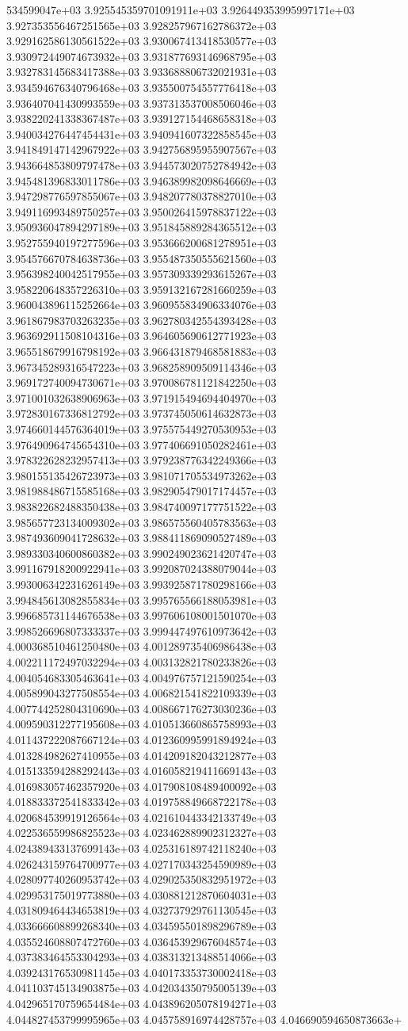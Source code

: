 534599047e+03	3.925545359701091911e+03	3.926449353995997171e+03	3.927353556467251565e+03	3.928257967162786372e+03	3.929162586130561522e+03	3.930067413418530577e+03	3.930972449074673932e+03	3.931877693146968795e+03	3.932783145683417388e+03	3.933688806732021931e+03	3.934594676340796468e+03	3.935500754557776418e+03	3.936407041430993559e+03	3.937313537008506046e+03	3.938220241338367487e+03	3.939127154468658318e+03	3.940034276447454431e+03	3.940941607322858545e+03	3.941849147142967922e+03	3.942756895955907567e+03	3.943664853809797478e+03	3.944573020752784942e+03	3.945481396833011786e+03	3.946389982098646669e+03	3.947298776597855067e+03	3.948207780378827010e+03	3.949116993489750257e+03	3.950026415978837122e+03	3.950936047894297189e+03	3.951845889284365512e+03	3.952755940197277596e+03	3.953666200681278951e+03	3.954576670784638736e+03	3.955487350555621560e+03	3.956398240042517955e+03	3.957309339293615267e+03	3.958220648357226310e+03	3.959132167281660259e+03	3.960043896115252664e+03	3.960955834906334076e+03	3.961867983703263235e+03	3.962780342554393428e+03	3.963692911508104316e+03	3.964605690612771923e+03	3.965518679916798192e+03	3.966431879468581883e+03	3.967345289316547223e+03	3.968258909509114346e+03	3.969172740094730671e+03	3.970086781121842250e+03	3.971001032638906963e+03	3.971915494694404970e+03	3.972830167336812792e+03	3.973745050614632873e+03	3.974660144576364019e+03	3.975575449270530953e+03	3.976490964745654310e+03	3.977406691050282461e+03	3.978322628232957413e+03	3.979238776342249366e+03	3.980155135426723973e+03	3.981071705534973262e+03	3.981988486715585168e+03	3.982905479017174457e+03	3.983822682488350438e+03	3.984740097177751522e+03	3.985657723134009302e+03	3.986575560405783563e+03	3.987493609041728632e+03	3.988411869090527489e+03	3.989330340600860382e+03	3.990249023621420747e+03	3.991167918200922941e+03	3.992087024388079044e+03	3.993006342231626149e+03	3.993925871780298166e+03	3.994845613082855834e+03	3.995765566188053981e+03	3.996685731144676538e+03	3.997606108001501070e+03	3.998526696807333337e+03	3.999447497610973642e+03	4.000368510461250480e+03	4.001289735406986438e+03	4.002211172497032294e+03	4.003132821780233826e+03	4.004054683305463641e+03	4.004976757121590254e+03	4.005899043277508554e+03	4.006821541822109339e+03	4.007744252804310690e+03	4.008667176273030236e+03	4.009590312277195608e+03	4.010513660865758993e+03	4.011437222087667124e+03	4.012360995991894924e+03	4.013284982627410955e+03	4.014209182043212877e+03	4.015133594288292443e+03	4.016058219411669143e+03	4.016983057462357920e+03	4.017908108489400092e+03	4.018833372541833342e+03	4.019758849668722178e+03	4.020684539919126564e+03	4.021610443342133749e+03	4.022536559986825523e+03	4.023462889902312327e+03	4.024389433137699143e+03	4.025316189742118240e+03	4.026243159764700977e+03	4.027170343254590989e+03	4.028097740260953742e+03	4.029025350832951972e+03	4.029953175019773880e+03	4.030881212870604031e+03	4.031809464434653819e+03	4.032737929761130545e+03	4.033666608899268340e+03	4.034595501898296789e+03	4.035524608807472760e+03	4.036453929676048574e+03	4.037383464553304293e+03	4.038313213488514066e+03	4.039243176530981145e+03	4.040173353730002418e+03	4.041103745134903875e+03	4.042034350795005139e+03	4.042965170759654484e+03	4.043896205078194271e+03	4.044827453799995965e+03	4.045758916974428757e+03	4.046690594650873663e+